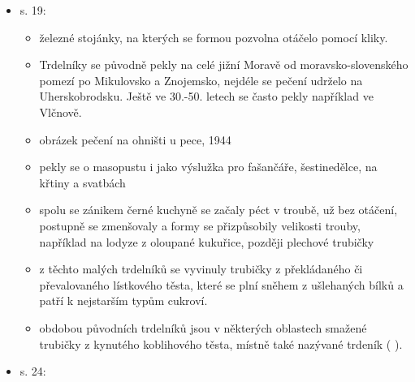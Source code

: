 \begin{itemize}
\begin{itemize}
    \begin{itemize}
    \tightlist
    \item
      Trdelníky, trdláče
    \item
      „Naše trdlo sa vdávalo, motovidlo sobě bralo
    \item
      název měly podle formy, trdla, na které se namotávaly, někde se
      ale řikalo trdelník formě a pečivu trdláč
    \item
      pekly se původně z přesného, později také kynutého těsta nad
      otevřený ohněm v černé kuchyni nebo na kraji pece
    \item
      trdlo mělo 50-\/-70 cm, opřené bylo o cihly nebo železné stojánky
    \end{itemize}
  \item
    s. 19:

    \begin{itemize}
    \tightlist
    \item
      železné stojánky, na kterých se formou pozvolna otáčelo pomocí
      kliky.
    \item
      Trdelníky se původně pekly na celé jižní Moravě od
      moravsko-slovenského pomezí po Mikulovsko a Znojemsko, nejdéle se
      pečení udrželo na Uherskobrodsku. Ještě ve 30.-50. letech se často
      pekly například ve Vlčnově.
    \item
      obrázek pečení na ohništi u pece,  1944
    \item
      pekly se o masopustu i jako výslužka pro fašančáře, šestinedělce,
      na křtiny a svatbách
    \item
      spolu se zánikem černé kuchyně se začaly péct v troubě, už bez
      otáčení, postupně se zmenšovaly a formy se přizpůsobily velikosti
      trouby, například na lodyze z oloupané kukuřice, později plechové
      trubičky
    \item
      z těchto malých trdelníků se vyvinuly trubičky z překládaného či
      převalovaného lístkového těsta, které se plní sněhem z ušlehaných
      bílků a patří k nejstarším typům cukroví.
    \item
      obdobou původních trdelníků jsou v některých oblastech smažené
      trubičky z kynutého koblihového těsta, místně také nazývané
      trdeník ( ).
    \end{itemize}
  \item
    s. 24:


\end{itemize}
\end{itemize}
